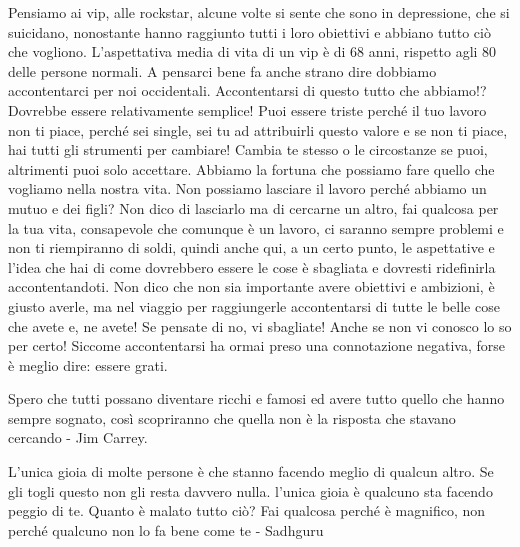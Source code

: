\documentclass[12pt]{book} %
\begin{document}
Pensiamo ai vip, alle rockstar, alcune volte si sente che sono in depressione, che si suicidano, nonostante hanno
raggiunto tutti i loro obiettivi e abbiano tutto ciò che vogliono. L'aspettativa media di vita di un vip è
di 68 anni, rispetto agli 80 delle persone normali. A pensarci bene fa anche strano dire dobbiamo accontentarci per noi
occidentali. Accontentarsi di questo tutto che abbiamo!? Dovrebbe essere relativamente semplice! Puoi essere
triste perché il tuo lavoro non ti piace, perché sei single, sei tu ad attribuirli questo valore e se non ti piace, hai tutti gli strumenti per cambiare!
Cambia te stesso o le circostanze se puoi, altrimenti puoi solo accettare. Abbiamo la fortuna che possiamo fare
quello che vogliamo nella nostra vita. Non possiamo lasciare il lavoro perché abbiamo un mutuo e dei figli? Non dico di
lasciarlo ma di cercarne un altro, fai qualcosa per la tua vita, consapevole che comunque è un lavoro, ci saranno
sempre problemi e non ti riempiranno di soldi, quindi anche qui, a un certo punto, le aspettative e
l'idea che hai di come dovrebbero essere le cose è sbagliata e dovresti ridefinirla
accontentandoti. Non dico che non sia importante avere obiettivi e ambizioni, è giusto averle, ma nel viaggio per
raggiungerle accontentarsi di tutte le belle cose che avete e, ne avete! Se pensate di no, vi sbagliate! Anche se non vi
conosco lo so per certo! Siccome accontentarsi ha ormai preso una connotazione negativa, forse è meglio dire: essere grati.

Spero che tutti possano diventare ricchi e famosi ed avere tutto quello che hanno sempre sognato, così scopriranno che
quella non è la risposta che stavano cercando - Jim Carrey.

L'unica gioia di molte persone è che stanno facendo meglio di qualcun altro. Se gli togli questo non gli resta davvero nulla. l'unica gioia è qualcuno sta facendo peggio di te. Quanto è malato tutto ciò? Fai qualcosa perché è magnifico, non perché qualcuno non lo fa bene come te - Sadhguru
\end{document}
